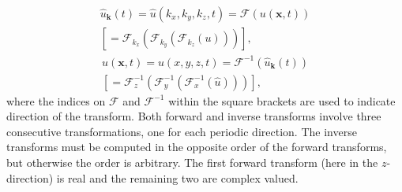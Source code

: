 \documentclass[final,3p,times,twocolumn]{elsarticle}
\begin{document}
\begin{multline}
\hat{u}_{\bm{k}}(t) = \hat{{u}}(k_x, k_y, k_z, t) = \mathcal{F}({u}(\bm{x}, 
t)) 
\\ \left[= \mathcal{F}_{k_x} \left(\mathcal{F}_{k_y} \left( \mathcal{F}_{k_z} 
({u}) \right) \right) \right], \label{eq:fft}
\end{multline}
\begin{multline}
{u}(\bm{x}, t) = {u}(x, y, z, t) = \mathcal{F}^{-1}(\hat{{u}}_{\bm{k}}(t)) \\ 
\left[= 
\mathcal{F}^{-1}_{z}\left(\mathcal{F}^{-1}_{y}\left(\mathcal{F}^{-1}_{x}(\hat{{u}})\right)\right)\right],
 \label{eq:ifft}
\end{multline}
where the indices on $\mathcal{F}$ and $\mathcal{F}^{-1}$ within the square 
brackets are used to indicate direction of the transform. Both forward and 
inverse transforms involve three consecutive transformations, one for each 
periodic direction. The inverse transforms must be computed in the opposite 
order of the forward transforms, but otherwise the order is arbitrary. The 
first forward transform (here in the $z$-direction) is real and the remaining 
two are complex valued.

\end{document}
